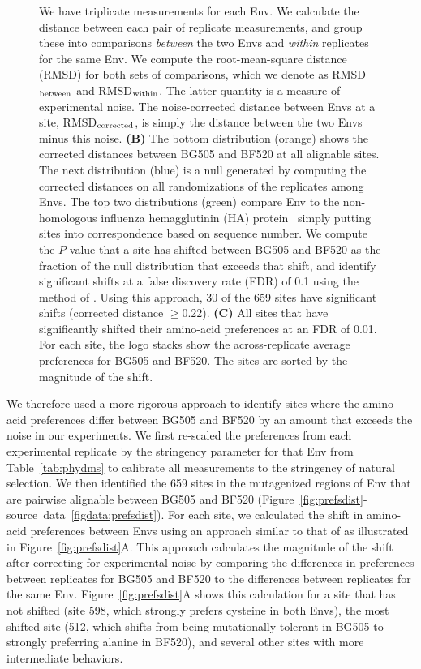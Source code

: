 \documentclass[9pt]{elife}
\begin{document}
\begin{figure}
\begin{fullwidth}
{We have triplicate measurements for each Env.
We calculate the distance between each pair of replicate measurements, and group these into comparisons \emph{between} the two Envs and \emph{within} replicates for the same Env.
We compute the root-mean-square distance (RMSD) for both sets of comparisons, which we denote as RMSD$_{\rm{between}}$ and RMSD$_{\rm{within}}$.
The latter quantity is a measure of experimental noise.
The noise-corrected distance between Envs at a site, RMSD$_{\rm{corrected}}$, is simply the distance between the two Envs minus this noise.
{\bf (B)} The bottom distribution (orange) shows the corrected distances between BG505 and BF520 at all alignable sites.
The next distribution (blue) is a null generated by computing the corrected distances on all randomizations of the replicates among Envs.
The top two distributions (green) compare Env to the non-homologous influenza hemagglutinin (HA) protein~\citep{doud2016accurate} simply putting sites into correspondence based on sequence number.
We compute the $P$-value that a site has shifted between BG505 and BF520 as the fraction of the null distribution that exceeds that shift, and identify significant shifts at a false discovery rate (FDR) of 0.1 using the method of \citet{benjamini1995controlling}.
Using this approach, 30 of the 659 sites have significant shifts (corrected distance $\ge$0.22).
{\bf (C)} All sites that have significantly shifted their amino-acid preferences at an FDR of 0.01.
For each site, the logo stacks show the across-replicate average preferences for BG505 and BF520.
The sites are sorted by the magnitude of the shift.
}
\end{fullwidth}
\end{figure}

We therefore used a more rigorous approach to identify sites where the amino-acid preferences differ between BG505 and BF520 by an amount that exceeds the noise in our experiments.
We first re-scaled the preferences from each experimental replicate by the stringency parameter for that Env from Table~\ref{tab:phydms} to calibrate all measurements to the stringency of natural selection.
We then identified the 659 sites in the mutagenized regions of Env that are pairwise alignable between BG505 and BF520 (Figure~\ref{fig:prefsdist}-source~data~\ref{figdata:prefsdist}).
For each site, we calculated the shift in amino-acid preferences between Envs using an approach similar to that of \citet{doud2015site} as illustrated in Figure~\ref{fig:prefsdist}A.
This approach calculates the magnitude of the shift after correcting for experimental noise by comparing the differences in preferences between replicates for BG505 and BF520 to the differences between replicates for the same Env.
Figure~\ref{fig:prefsdist}A shows this calculation for a site that has not shifted (site 598, which strongly prefers cysteine in both Envs), the most shifted site (512, which shifts from being mutationally tolerant in BG505 to strongly preferring alanine in BF520), and several other sites with more intermediate behaviors.
\end{document}
